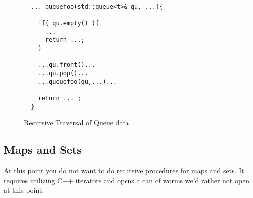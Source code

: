\documentclass[nobib]{tufte-handout}
\begin{document}
\begin{figure}[!htbp]
\begin{lstlisting}

  ... queuefoo(std::queue<t>& qu, ...){

    if( qu.empty() ){
      ...
      return ...;
    }

    ...qu.front()...
    ...qu.pop()...
    ...queuefoo(qu,...)...

    return ... ;
  }
\end{lstlisting}
\caption{Recursive Traversal of Queue data}
\end{figure}

\subsection{Maps and Sets}

At this point you do not want to do recursive procedures for maps and sets. It requires utilizing C++ iterators and opens a can of worms we'd rather not open at this point.
\end{document}
